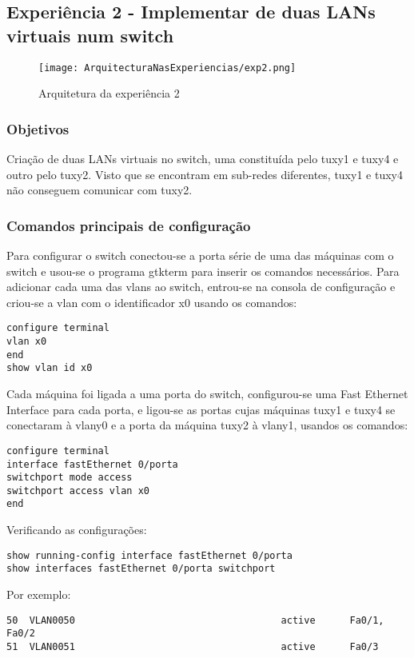 \documentclass[a4paper]{article}
\begin{document}
\subsection{Experiência 2 - Implementar de duas LANs virtuais num switch}

\begin{figure}[h]
    \centering
    \texttt{[image: ArquitecturaNasExperiencias/exp2.png]}
    \caption{Arquitetura da experiência 2}
\end{figure}

\subsubsection{Objetivos}
Criação de duas LANs virtuais no switch, uma constituída pelo tuxy1 e tuxy4 e outro pelo tuxy2.
Visto que se encontram em sub-redes diferentes, tuxy1 e tuxy4 não conseguem comunicar com tuxy2.

\subsubsection{Comandos principais de configuração}
Para configurar o switch conectou-se a porta série de uma das máquinas com o switch e usou-se o programa gtkterm para inserir os comandos necessários.
Para adicionar cada uma das vlans ao switch, entrou-se na consola de configuração e criou-se a vlan com o identificador x0 usando os comandos:
\begin{verbatim}
configure terminal
vlan x0
end
show vlan id x0
\end{verbatim}
Cada máquina foi ligada a uma porta do switch, configurou-se uma Fast Ethernet Interface para cada porta, e ligou-se as portas cujas máquinas tuxy1 e tuxy4 se conectaram à vlany0 e a porta da máquina tuxy2 à vlany1, usandos os comandos:
\begin{verbatim}
configure terminal
interface fastEthernet 0/porta
switchport mode access
switchport access vlan x0
end
\end{verbatim}
Verificando as configurações:
\begin{verbatim}
show running-config interface fastEthernet 0/porta
show interfaces fastEthernet 0/porta switchport
\end{verbatim}

Por exemplo:
\begin{verbatim}
50	VLAN0050									active		Fa0/1, Fa0/2
51 	VLAN0051									active		Fa0/3
\end{verbatim}
\end{document}
